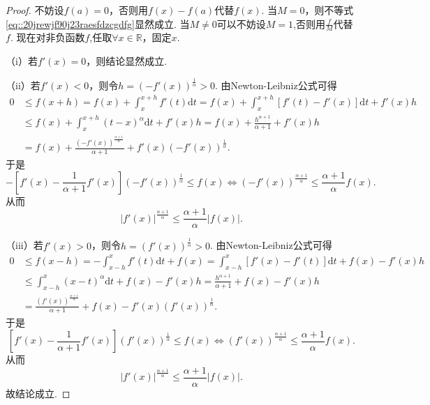 \documentclass[../../main.tex]{subfiles}%
\begin{document}
\begin{proof}

不妨设$f(a)=0$，否则用$f(x) - f(a)$代替$f(x)$. 当$M = 0$，则不等式\eqref{eq::20jrewjf90j23raesfdzcgdfg}显然成立. 当$M\neq0$可以不妨设$M = 1$,否则用$\frac{f}{M}$代替$f$.
现在对非负函数$f$,任取$\forall x \in \mathbb{R}$，固定$x$.

（i）若$f'(x) = 0$，则结论显然成立.

（ii）若$f'(x) < 0$，则令$h = \left( -f'(x) \right)^{\frac{1}{\alpha}} > 0$. 由Newton-Leibniz公式可得
\begin{align*}
0 &\leqslant f(x + h) = f(x) + \int_x^{x + h} f'(t) \mathrm{d}t = f(x) + \int_x^{x + h} \left[ f'(t) - f'(x) \right] \mathrm{d}t + f'(x) h \\
&\leqslant f(x) + \int_x^{x + h} \left( t - x \right)^{\alpha} \mathrm{d}t + f'(x) h = f(x) + \frac{h^{\alpha + 1}}{\alpha + 1} + f'(x) h \\
&= f(x) + \frac{\left( -f'(x) \right)^{\frac{\alpha + 1}{\alpha}}}{\alpha + 1} + f'(x) \left( -f'(x) \right)^{\frac{1}{\alpha}}.
\end{align*}
于是
$$
-\left[ f'(x) - \frac{1}{\alpha + 1} f'(x) \right] \left( -f'(x) \right)^{\frac{1}{\alpha}} \leqslant f(x)\Longleftrightarrow \left( -f'(x) \right)^{\frac{\alpha+1}{\alpha}} \leqslant \frac{\alpha + 1}{\alpha} f(x).
$$
从而
$$
\left| f'(x) \right|^{\frac{\alpha + 1}{\alpha}} \leqslant \frac{\alpha + 1}{\alpha} |f(x)|.
$$

（iii）若$f'(x) > 0$，则令$h = \left( f'(x) \right)^{\frac{1}{\alpha}} > 0$. 由Newton-Leibniz公式可得
\begin{align*}
0 &\leqslant f(x - h) = -\int_{x - h}^x f'(t) \mathrm{d}t + f(x) = \int_{x - h}^x \left[ f'(x) - f'(t) \right] \mathrm{d}t + f(x) - f'(x) h \\
&\leqslant \int_{x - h}^x \left( x - t \right)^{\alpha} \mathrm{d}t + f(x) - f'(x) h = \frac{h^{\alpha + 1}}{\alpha + 1} + f(x) - f'(x) h \\
&= \frac{\left( f'(x) \right)^{\frac{\alpha + 1}{\alpha}}}{\alpha + 1} + f(x) - f'(x) \left( f'(x) \right)^{\frac{1}{\alpha}}.
\end{align*}
于是
$$\left[ f'(x) - \frac{1}{\alpha + 1} f'(x) \right] \left( f'(x) \right)^{\frac{1}{\alpha}} \leqslant f(x)\Longleftrightarrow \left( f'(x) \right)^{\frac{\alpha + 1}{\alpha}} \leqslant \frac{\alpha + 1}{\alpha} f(x).$$
从而
$$\left| f'(x) \right|^{\frac{\alpha + 1}{\alpha}} \leqslant \frac{\alpha + 1}{\alpha} |f(x)|.$$
故结论成立.

\end{proof}
\end{document}
